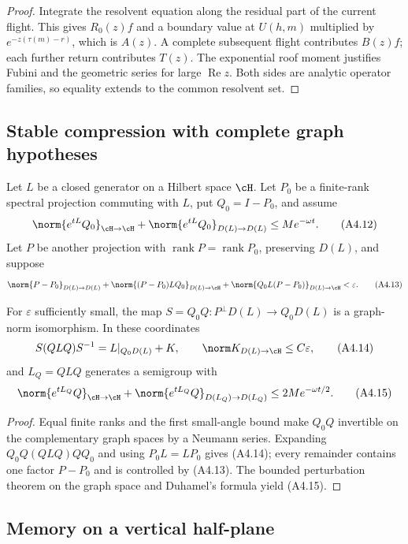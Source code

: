 \begin{proof}
Integrate the resolvent equation along the residual part of the current
flight.  This gives $R_0(z)f$ and a boundary value at $U(h,m)$ multiplied by
$e^{-z(\tau(m)-r)}$, which is $A(z)$.  A complete subsequent flight contributes
$B(z)f$; each further return contributes $T(z)$.  The exponential roof moment
justifies Fubini and the geometric series for large $\operatorname{Re}z$.
Both sides are analytic operator families, so equality extends to the common
resolvent set.
\end{proof}

\subsection{Stable compression with complete graph hypotheses}

Let $L$ be a closed generator on a Hilbert space $\cH$.  Let $P_0$ be a
finite-rank spectral projection commuting with $L$, put $Q_0=I-P_0$, and
assume
\[
 \norm{e^{tL}Q_0}_{\cH\to\cH}
 +\norm{e^{tL}Q_0}_{D(L)\to D(L)}\le Me^{-\omega t}.       \tag{A4.12}
\]
Let $P$ be another projection with
$\operatorname{rank}P=\operatorname{rank}P_0$, preserving $D(L)$, and suppose
\[
 \norm{P-P_0}_{D(L)\to D(L)}
 +\norm{(P-P_0)LQ_0}_{D(L)\to\cH}
 +\norm{Q_0L(P-P_0)}_{D(L)\to\cH}<\varepsilon.            \tag{A4.13}
\]

\begin{lemma}
\label{lem:r29-a4-compression}
For $\varepsilon$ sufficiently small, the map
$S=Q_0Q:P\!^\perp D(L)\to Q_0D(L)$ is a graph-norm isomorphism.  In these
coordinates
\[
 S(QLQ)S^{-1}=L|_{Q_0D(L)}+K,\qquad
 \norm K_{D(L)\to\cH}\le C\varepsilon,                   \tag{A4.14}
\]
and $L_Q=QLQ$ generates a semigroup with
\[
 \norm{e^{tL_Q}Q}_{\cH\to\cH}
 +\norm{e^{tL_Q}Q}_{D(L_Q)\to D(L_Q)}
 \le2Me^{-\omega t/2}.                                   \tag{A4.15}
\]
\end{lemma}

\begin{proof}
Equal finite ranks and the first small-angle bound make $Q_0Q$ invertible on
the complementary graph spaces by a Neumann series.  Expanding
$Q_0Q(QLQ)QQ_0$ and using $P_0L=LP_0$ gives (A4.14); every remainder contains
one factor $P-P_0$ and is controlled by (A4.13).  The bounded perturbation
theorem on the graph space and Duhamel's formula yield (A4.15).
\end{proof}

\subsection{Memory on a vertical half-plane}

